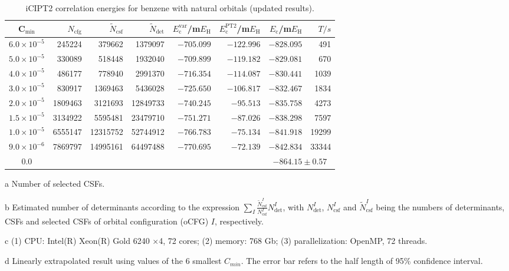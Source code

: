 \documentclass[journal=jcp,manuscript=suppinfo]{achemso}
\begin{document}
\begin{table}[!htp]
	\small
	\caption{iCIPT2 correlation energies for benzene with natural orbitals (updated results).}
\begin{threeparttable}
	\centering
	\begin{tabular}{c|rrrrrrr}\toprule
		C$_{\text{min}}$&$N_{\mathrm{cfg}}$&$\tilde{N}_{\mathrm{csf}}$\tnote{a}&$\tilde{N}_{\mathrm{det}}$\tnote{b}
		&$E_{\mathrm{c}}^{\mathrm{var}}$/m$E_{\text{H}}$&$E_{\mathrm{c}}^{\mathrm{PT2}}$/m$E_{\text{H}}$&$E_{\mathrm{c}}$/m$E_{\text{H}}$&$T/s$\tnote{c}\\\toprule
		$6.0\times10^{-5}$ &   245224 &   379662 & 1379097
		&  $-705.099$  &  $-122.996$&  $-828.095$ &491\\
		$5.0\times10^{-5}$ &   330089 &   518448 & 1932040
		&  $-709.899$  &  $-119.182$&  $-829.081$ &670\\
		$4.0\times10^{-5}$ &   486177 &   778940 & 2991370
		&  $-716.354$  &  $-114.087$&  $-830.441$ &1039\\
		$3.0\times10^{-5}$ &   830917 &  1369463 & 5436028
		&  $-725.650$  &  $-106.817$&  $-832.467$ &1834\\
		$2.0\times10^{-5}$ &  1809463 &  3121693 &12849733
		&  $-740.245$  &  $-95.513$&  $-835.758$ &4273\\
		$1.5\times10^{-5}$ &  3134922 &  5595481 &23479710
		&  $-751.271$  &  $-87.026$&  $-838.298$ &7597\\
		$1.0\times10^{-5}$ &  6555147 & 12315752 &52744912
		&  $-766.783$  &  $-75.134$&  $-841.918$ &19299\\
		$9.0\times10^{-6}$ &  7869797 & 14995161 &64497488
		&  $-770.695$  &  $-72.139$&  $-842.834$ &33344\\\midrule
		0.0\tnote{d}&&&&&&\multicolumn{2}{c}{$-864.15\pm0.57$}\\\bottomrule
	\end{tabular}
\begin{tablenotes}
	\item[a]Number of selected CSFs.
	\item[b]Estimated number of determinants according to the expression $\sum_I\frac{\tilde{N}_{\mathrm{csf}}^I}{N_{\mathrm{csf}}^I}N_{\mathrm{det}}^I$, with $N_{\mathrm{det}}^I$, $N_{\mathrm{csf}}^I$ and $\tilde{N}_{\mathrm{csf}}^I$ being the numbers of determinants, CSFs and selected CSFs of orbital configuration (oCFG) $I$, respectively.
	\item[c](1) CPU: Intel(R) Xeon(R) Gold 6240 $\times$4, 72 cores; (2) memory: 768 Gb; (3) parallelization: OpenMP, 72 threads.
	\item[d]Linearly extrapolated result using values of the 6 smallest $C_{min}$. The error bar refers to the half length of 95\% confidence interval.
\end{tablenotes}
\end{threeparttable}
\label{NewNO}
\end{table}
\end{document}
